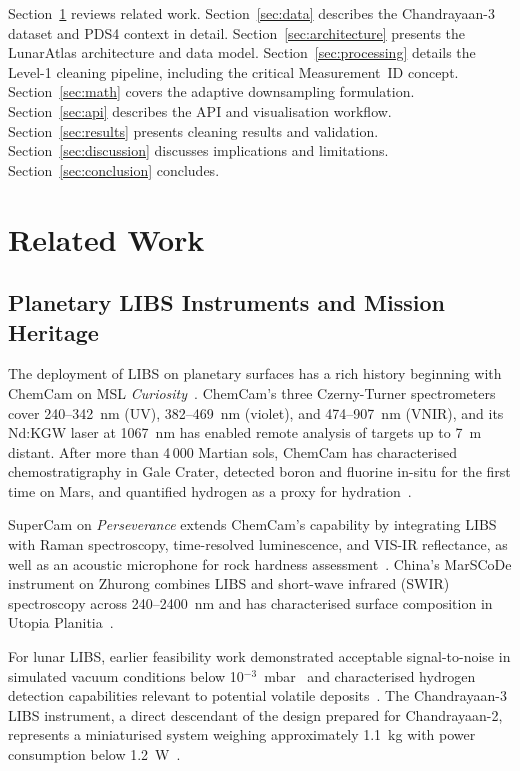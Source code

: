 \documentclass[a4paper,twocolumn,10pt]{article}
\begin{document}
Section~\ref{sec:related} reviews related work.
Section~\ref{sec:data} describes the Chandrayaan-3 dataset and PDS4
context in detail.  Section~\ref{sec:architecture} presents the
LunarAtlas architecture and data model.
Section~\ref{sec:processing} details the Level-1 cleaning pipeline,
including the critical Measurement~ID concept.
Section~\ref{sec:math} covers the adaptive downsampling formulation.
Section~\ref{sec:api} describes the API and visualisation workflow.
Section~\ref{sec:results} presents cleaning results and validation.
Section~\ref{sec:discussion} discusses implications and limitations.
Section~\ref{sec:conclusion} concludes.


\section{Related Work}
\label{sec:related}

\subsection{Planetary LIBS Instruments and Mission Heritage}

The deployment of LIBS on planetary surfaces has a rich history
beginning with ChemCam on MSL \emph{Curiosity}~\cite{Wiens2012,
Maurice2012}.  ChemCam's three Czerny-Turner spectrometers cover
240--342~nm (UV), 382--469~nm (violet), and 474--907~nm (VNIR), and
its Nd:KGW laser at 1067~nm has enabled remote analysis of targets up
to 7~m distant.  After more than 4\,000 Martian sols, ChemCam has
characterised chemostratigraphy in Gale Crater, detected boron and
fluorine in-situ for the first time on Mars, and quantified hydrogen as
a proxy for hydration~\cite{Gasda2017,Schroder2015}.

SuperCam on \emph{Perseverance} extends ChemCam's capability by
integrating LIBS with Raman spectroscopy, time-resolved luminescence,
and VIS-IR reflectance, as well as an acoustic microphone for rock
hardness assessment~\cite{Wiens2020,Maurice2022}.  China's MarSCoDe
instrument on Zhurong combines LIBS and short-wave infrared (SWIR)
spectroscopy across 240--2400~nm and has characterised surface
composition in Utopia Planitia~\cite{Xu2021,Zhao2023}.

For lunar LIBS, earlier feasibility work demonstrated acceptable
signal-to-noise in simulated vacuum conditions below
10$^{-3}$~mbar~\cite{Knight2000,Lasue2012} and characterised
hydrogen detection capabilities relevant to potential volatile
deposits~\cite{Yumoto2023}.  The Chandrayaan-3 LIBS instrument, a
direct descendant of the design prepared for Chandrayaan-2, represents
a miniaturised system weighing approximately 1.1~kg with power
consumption below 1.2~W~\cite{Laxmiprasad2020}.
\end{document}
